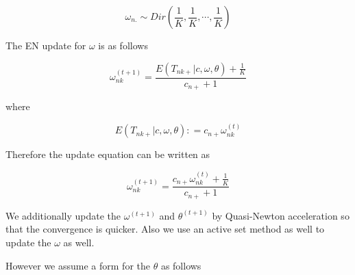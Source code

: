 \documentclass[a4paper, 12pt]{article}
\begin{document}
$$ \omega_{n.} \sim Dir \left (\frac{1}{K}, \frac{1}{K}, \cdots, \frac{1}{K} \right)  $$

The EN update for $\omega$ is as follows 

$$ \omega^{(t+1)}_{nk} =  \frac{E \left ( T_{nk+} | c, \omega, \theta \right) + \frac{1}{K}}{c_{n+} + 1} $$

where 

$$  E \left ( T_{nk+} | c, \omega, \theta \right) : = c_{n+} \omega^{(t)}_{nk}  $$

Therefore the update equation can be written as 

$$   \omega^{(t+1)}_{nk} =  \frac{c_{n+} \omega^{(t)}_{nk} + \frac{1}{K}}{c_{n+} + 1} $$

We additionally update the $\omega^{(t+1)}$ and $\theta^{(t+1)}$ by Quasi-Newton acceleration so that the convergence is quicker. Also we use an active set method as well to update the $\omega$  as well. 

However we assume a form for the $\theta$ as follows 
\end{document}
